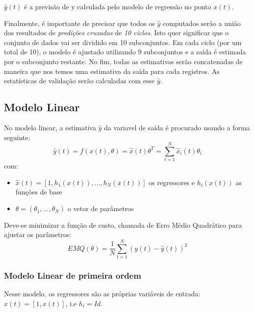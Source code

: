 \documentclass[paper=a4, fontsize=11pt]{article} %
\numberwithin{equation}{section} %
\numberwithin{figure}{section} %
\numberwithin{table}{section} %
\begin{document}
$\hat{y}(t)$ é a previsão de y calculada pelo modelo de regressão no ponto $x(t)$.\newline

Finalmente, é importante de precisar que todos os $\hat{y}$ computados serão a união dos resultados de \emph{predições cruzadas} de \emph{10 ciclos}.
Isto quer significar que o conjunto de dados vai ser dividido em 10 subconjuntos.
Em cada ciclo (por um total de 10), o modelo é ajustado utilizando 9 subconjuntos e a saída é estimada por o subconjunto restante.
No fim, todas as estimativas serão concatenadas de maneira que nos temos uma estimativa da saída para cada registros.\newline
As estatísticas de validação serão calculadas com esse $\hat{y}$.

\subsection{Modelo Linear}

No modelo linear, a estimativa $\hat{y}$ da variavel de saída é procurado usando a forma seguinte:
\begin{equation}
\hat{y}(t) = f(x(t),{\theta}) = \hat{x}(t){\theta}^{T} = \sum_{t=1}^{N} \hat{x}_i(t){\theta}_i
\end{equation}
com:
\begin{itemize}
\item $\hat{x}(t) = [1, h_1(x(t)), ..., h_N(x(t))]$ os regressores e $h_i(x(t))$ as funções de base
\item ${\theta} = ({\theta}_1, ...,{\theta}_N)$ o vetor de parâmetros
\end{itemize}

\medskip
Deve-se minimizar a função de custo, chamada de Erro Médio Quadrático para ajustar os parâmetros:
\begin{equation}
EMQ({\theta}) = \frac{1}{N}\sum_{t=1}^{N} (y(t) - \hat{y}(t))^{2}
\end{equation}

\subsubsection{Modelo Linear de primeira ordem}
Nesse modelo, os regressores são as próprias variáveis de entrada: $\hat{x}(t) = [1, x(t)]$, i.e $h_i = Id$.
\end{document}
